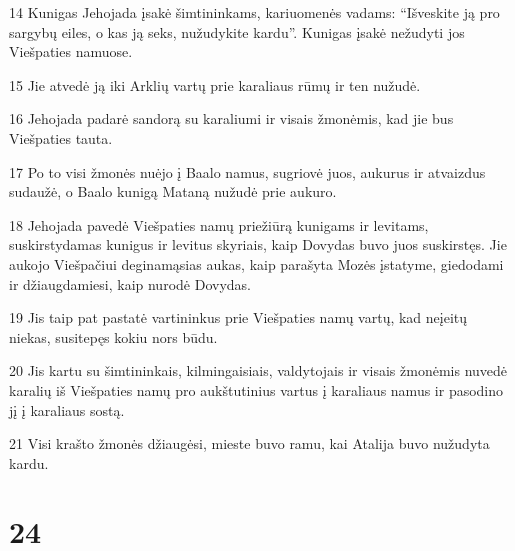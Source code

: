 \par 14 Kunigas Jehojada įsakė šimtininkams, kariuomenės vadams: “Išveskite ją pro sargybų eiles, o kas ją seks, nužudykite kardu”. Kunigas įsakė nežudyti jos Viešpaties namuose. 
\par 15 Jie atvedė ją iki Arklių vartų prie karaliaus rūmų ir ten nužudė. 
\par 16 Jehojada padarė sandorą su karaliumi ir visais žmonėmis, kad jie bus Viešpaties tauta. 
\par 17 Po to visi žmonės nuėjo į Baalo namus, sugriovė juos, aukurus ir atvaizdus sudaužė, o Baalo kunigą Mataną nužudė prie aukuro. 
\par 18 Jehojada pavedė Viešpaties namų priežiūrą kunigams ir levitams, suskirstydamas kunigus ir levitus skyriais, kaip Dovydas buvo juos suskirstęs. Jie aukojo Viešpačiui deginamąsias aukas, kaip parašyta Mozės įstatyme, giedodami ir džiaugdamiesi, kaip nurodė Dovydas. 
\par 19 Jis taip pat pastatė vartininkus prie Viešpaties namų vartų, kad neįeitų niekas, susitepęs kokiu nors būdu. 
\par 20 Jis kartu su šimtininkais, kilmingaisiais, valdytojais ir visais žmonėmis nuvedė karalių iš Viešpaties namų pro aukštutinius vartus į karaliaus namus ir pasodino jį į karaliaus sostą. 
\par 21 Visi krašto žmonės džiaugėsi, mieste buvo ramu, kai Atalija buvo nužudyta kardu.



\chapter{24}

